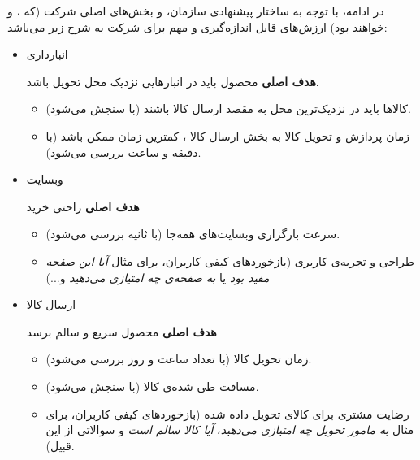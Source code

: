 \documentclass[12pt]{article}
\begin{document}
در ادامه، با توجه به ساختار پیشنهادی سازمان، و بخش‌های اصلی شرکت  (که ، 
و  خواهند بود) ارزش‌های قابل‌ اندازه‌گیری \label{movs}
و مهم برای شرکت  به شرح زیر می‌باشد:

\begin{itemize}
    \item  انبارداری 
    
    \textbf{هدف اصلی} محصول باید در انبار‌هایی نزدیک محل تحویل باشد.
    \begin{itemize}
        \item 
        کالا‌ها باید در نزدیک‌ترین محل به مقصد ارسال کالا باشند (با سنجش می‌شود).
        
        \item 
        زمان پردازش و تحویل کالا به بخش ارسال کالا ، کمترین زمان ممکن باشد (با دقیقه و ساعت بررسی می‌شود).        
    \end{itemize}
    
    \item وبسایت  
    
    \textbf{هدف اصلی} راحتی خرید
    \begin{itemize}
        \item سرعت بارگزاری وبسایت‌های  همه‌جا (با ثانیه بررسی می‌شود).
        
        \item 
        طراحی و تجربه‌ی کاربری  (بازخورد‌های کیفی کاربران، برای مثال \textit{آیا این صفحه مفید بود} یا \textit{به صفحه‌ی  چه امتیازی می‌دهید} و...)
    \end{itemize}

    \item ارسال کالا 
    
    \textbf{هدف اصلی} محصول سریع و سالم برسد
    \begin{itemize}
        \item 
        زمان تحویل کالا (با تعداد ساعت و روز بررسی می‌شود).
        \item 
        مسافت طی شده‌ی کالا (با  سنجش می‌شود).
        
        \item 
        رضایت مشتری برای کالای تحویل داده شده (بازخورد‌های کیفی کاربران، برای مثال 
        \textit{به مامور تحویل چه امتیازی می‌دهید}،
        \textit{آیا کالا سالم است} و سوالاتی از این قبیل).
    \end{itemize}
\end{itemize}
\end{document}
